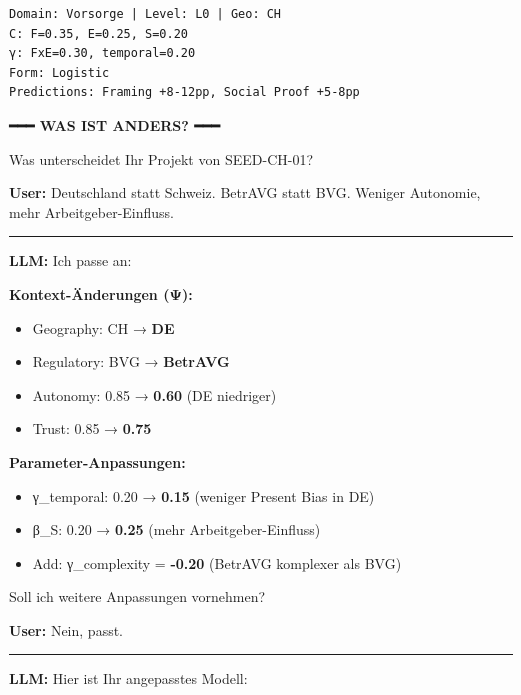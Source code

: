 \begin{tcolorbox}[colback=orange!5!white, colframe=orange!75!black,
    title=Example: TEMPLATE Model Design (Start from Seed), breakable]
\begin{verbatim}
Domain: Vorsorge | Level: L0 | Geo: CH
C: F=0.35, E=0.25, S=0.20
γ: FxE=0.30, temporal=0.20
Form: Logistic
Predictions: Framing +8-12pp, Social Proof +5-8pp
\end{verbatim}

\vspace{0.3em}
\textbf{━━━ WAS IST ANDERS? ━━━}
\vspace{0.3em}

Was unterscheidet Ihr Projekt von SEED-CH-01?

\textbf{User:} Deutschland statt Schweiz. BetrAVG statt BVG. Weniger
Autonomie, mehr Arbeitgeber-Einfluss.

\hrule
\vspace{0.3em}

\textbf{LLM:} Ich passe an:

\textbf{Kontext-Änderungen (Ψ):}
\begin{itemize}[nosep]
\item Geography: CH → \textbf{DE}
\item Regulatory: BVG → \textbf{BetrAVG}
\item Autonomy: 0.85 → \textbf{0.60} (DE niedriger)
\item Trust: 0.85 → \textbf{0.75}
\end{itemize}

\textbf{Parameter-Anpassungen:}
\begin{itemize}[nosep]
\item γ\_temporal: 0.20 → \textbf{0.15} (weniger Present Bias in DE)
\item β\_S: 0.20 → \textbf{0.25} (mehr Arbeitgeber-Einfluss)
\item Add: γ\_complexity = \textbf{-0.20} (BetrAVG komplexer als BVG)
\end{itemize}

Soll ich weitere Anpassungen vornehmen?

\textbf{User:} Nein, passt.

\hrule
\vspace{0.5em}

\textbf{LLM:} Hier ist Ihr angepasstes Modell:

\vspace{0.3em}
\end{tcolorbox}
